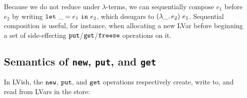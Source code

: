 

Because we do not reduce under $\lambda$-terms, we can sequentially
compose $e_1$ before $e_2$ by writing $\mbox{\texttt{let}}~\_=e_1~\mbox{\texttt{in}}~e_2$, which
desugars to $(\lambda\_.\,e_2)~e_1$.  Sequential composition is
useful, for instance, when allocating a new LVar before beginning a
set of side-effecting $\mbox{\texttt{put}}$/$\mbox{\texttt{get}}$/$\mbox{\texttt{freeze}}$ operations on it.

\subsection{Semantics of \lstinline|new|, \lstinline|put|, and \lstinline|get|}\label{subsection:newputget}

In LVish, the $\mbox{\texttt{new}}$, $\mbox{\texttt{put}}$, and $\mbox{\texttt{get}}$ operations respectively
create, write to, and read from LVars in the store:

